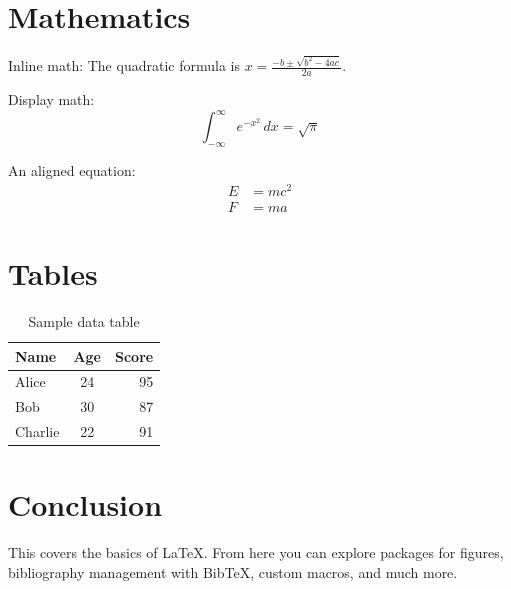 \documentclass[12pt]{article}
\begin{document}
\section{Mathematics}

Inline math: The quadratic formula is $x = \frac{-b \pm \sqrt{b^2 - 4ac}}{2a}$.

Display math:
\[
  \int_{-\infty}^{\infty} e^{-x^2} \, dx = \sqrt{\pi}
\]

An aligned equation:
\begin{align}
  E &= mc^2 \\
  F &= ma
\end{align}

\section{Tables}

\begin{table}[h]
  \centering
  \begin{tabular}{|l|c|r|}
    \hline
    \textbf{Name} & \textbf{Age} & \textbf{Score} \\
    \hline
    Alice   & 24 & 95 \\
    Bob     & 30 & 87 \\
    Charlie & 22 & 91 \\
    \hline
  \end{tabular}
  \caption{Sample data table}
  \label{tab:sample}
\end{table}

\section{Conclusion}

This covers the basics of \LaTeX{}. From here you can explore packages for
figures, bibliography management with BibTeX, custom macros, and much more.
\end{document}
